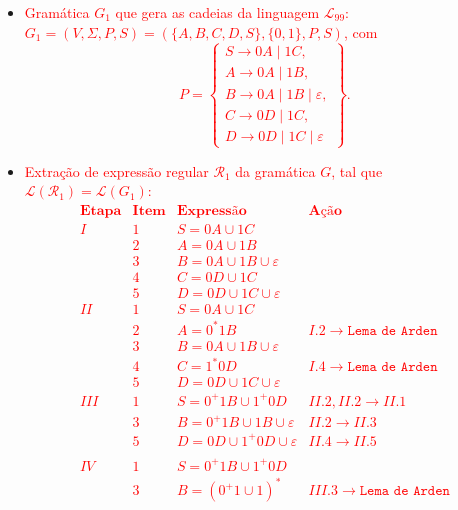 \documentclass[12pt]{article}
\def\myling{{99}} %
\begin{document}
\begin{itemize}
  \item  \textcolor{red}{Gramática $G_1$ que gera as cadeias da linguagem $\mathcal{L}_{\myling}$:\\ $G_1=(V,\Sigma,P,S)=(\{A,B,C,D,S\},\{0,1\},P,S)$, com
  $$
   P =
   \left\{\begin{array}{l}
    S \to 0A \mid 1C,\\
    A \to 0A \mid 1B,\\
    B \to 0A \mid 1B \mid \varepsilon,\\
    C \to 0D \mid 1C,\\
    D \to 0D \mid 1C \mid \varepsilon
   \end{array}\right\}.
  $$
  }
  \item  \textcolor{red}{Extração de expressão regular $\mathcal{R}_1$ da gramática $G$, tal que $\mathcal{L}(\mathcal{R}_1)=\mathcal{L}(G_1)$:\\
  $$
  \begin{array}{ccll}
  \hline
  \textbf{Etapa} & \textbf{Item} & \textbf{Expressão} & \textbf{Ação}\\
  \hline
    I & 1 & S = 0A \cup 1C &\\
      & 2 & A = 0A \cup 1B &\\
      & 3 & B = 0A \cup 1B \cup \varepsilon&\\
      & 4 & C = 0D \cup 1C &\\
      & 5 & D = 0D \cup 1C \cup \varepsilon&\\
  \hline
   II & 1 & S = 0A \cup 1C &\\
      & 2 & A = 0^*1B      & I.2 \rightarrow \texttt{Lema de Arden}\\
      & 3 & B = 0A \cup 1B \cup \varepsilon&\\
      & 4 & C = 1^*0D      & I.4 \rightarrow \texttt{Lema de Arden}\\
      & 5 & D = 0D \cup 1C \cup \varepsilon&\\
  \hline
  III & 1 & S = 0^+1B \cup 1^+0D & II.2, II.2 \rightarrow II.1\\
      & 3 & B = 0^+1B \cup 1B \cup \varepsilon & II.2 \rightarrow II.3\\
      & 5 & D = 0D \cup 1^+0D \cup \varepsilon&II.4 \rightarrow II.5\\\\
  \hline
   IV & 1 & S = 0^+1B \cup 1^+0D &\\
      & 3 & B = (0^+1 \cup 1)^* & III.3 \rightarrow \texttt{Lema de Arden}\\

\end{array}$$}
\end{itemize}
\end{document}

